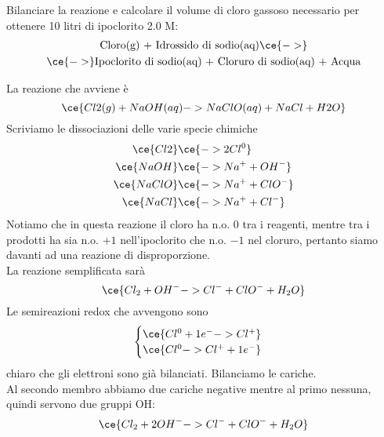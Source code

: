 \begin{esercizio}
    Bilanciare la reazione e calcolare il volume di cloro gassoso necessario per ottenere 10 litri di ipoclorito 2.0 M:
    \begin{gather*}
        \text{Cloro(g) + Idrossido di sodio(aq)} \ce{->}
        \\
        \ce{->} \text{Ipoclorito di sodio(aq) + Cloruro di sodio(aq) + Acqua}
    \end{gather*}
\end{esercizio}
\begin{soluzione}
    La reazione che avviene è
    \begin{equation*}
        \ce{Cl2(g) + NaOH(aq) -> NaClO(aq) + NaCl + H2O}
    \end{equation*}
    Scriviamo le dissociazioni delle varie specie chimiche
    \begin{equation*}
        \begin{split}
            \ce{Cl2} & \ce{-> 2Cl^0}
            \\
            \ce{NaOH} & \ce{-> Na^+ + OH^-}
            \\
            \ce{NaClO} & \ce{-> Na^+ + ClO^-}
            \\
            \ce{NaCl} & \ce{-> Na^+ + Cl^-}
        \end{split}
    \end{equation*}
    Notiamo che in questa reazione il cloro ha n.o. $0$ tra i reagenti, mentre tra i prodotti ha sia n.o. $+1$ nell'ipoclorito che n.o. $-1$ nel cloruro, pertanto siamo davanti ad una reazione di disproporzione.\\
    La reazione semplificata sarà
    \begin{equation*}
        \ce{Cl_2 + OH^- -> Cl^- + ClO^- + H_2O}
    \end{equation*}
    Le semireazioni redox che avvengono sono
    \begin{equation*}
        \begin{cases}
            \ce{Cl^{0} + 1e^- -> Cl^+}\\
            \ce{Cl^{0} -> Cl^+ + 1e^-}
        \end{cases}
    \end{equation*}
    \E chiaro che gli elettroni sono già bilanciati. Bilanciamo le cariche.\\
    Al secondo membro abbiamo due cariche negative mentre al primo nessuna, quindi servono due gruppi OH:
    \begin{equation*}
        \ce{Cl_2 + 2OH^- -> Cl^- + ClO^- + H_2O}

\end{equation*}
\end{soluzione}
